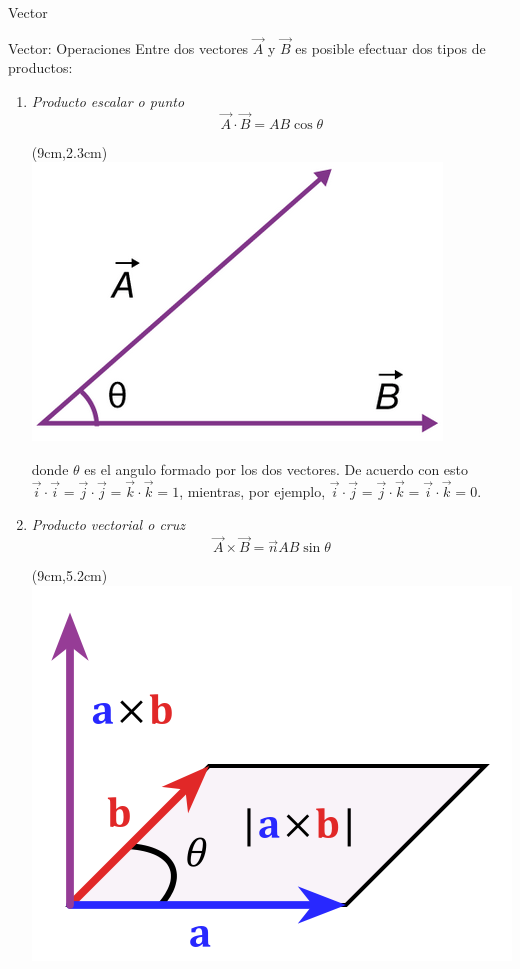 \documentclass [xcolor=svgnames, t] {beamer}
\begin{document}
\begin{frame}{Vector}
\vspace{-0.5cm}
\begin{block}{Vector: Operaciones}
Entre dos vectores $\vec{A}$ y $\vec{B}$ es posible efectuar dos tipos de productos:
\begin{enumerate}
\item \emph{Producto escalar o punto}
\vspace{0.3cm}
$$
\vec{A}\cdot \vec{B} = AB \cos \theta
$$
\begin{textblock*}{3cm}(9cm,2.3cm) %
\includegraphics[width=\textwidth]{pes}
\end{textblock*}
donde $\theta$ es el angulo formado por los dos vectores. De acuerdo con esto $\vec{i} \cdot \vec{i} = \vec{j} \cdot \vec{j}= \vec{k} \cdot \vec{k} = 1$, mientras, por ejemplo, $\vec{i} \cdot \vec{j} = \vec{j} \cdot \vec{k} =\vec{i} \cdot \vec{k} = 0$.
\item \emph{Producto vectorial o cruz}
$$
\vec{A} \times \vec{B} = \vec{n}AB \sin \theta
$$
\begin{textblock*}{3cm}(9cm,5.2cm) %
\includegraphics[width=\textwidth]{crop}

\end{textblock*}
\end{enumerate}
\end{block}
\end{frame}
\end{document}
